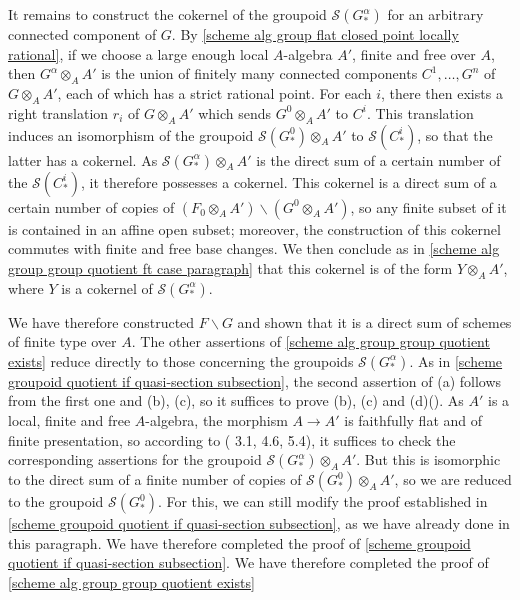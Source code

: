 It remains to construct the cokernel of the groupoid $\mathcal{S}(G_*^\alpha)$ for an arbitrary connected component of $G$. By \cref{scheme alg group flat closed point locally rational}, if we choose a large enough local $A$-algebra $A'$, finite and free over $A$, then $G^\alpha\otimes_AA'$ is the union of finitely many connected components $C^1,\dots,G^n$ of $G\otimes_AA'$, each of which has a strict rational point. For each $i$, there then exists a right translation $r_i$ of $G\otimes_AA'$ which sends $G^0\otimes_AA'$ to $C^i$. This translation induces an isomorphism of the groupoid $\mathcal{S}(G^0_*)\otimes_AA'$ to $\mathcal{S}(C^i_*)$, so that the latter has a cokernel. As $\mathcal{S}(G^\alpha_*)\otimes_AA'$ is the direct sum of a certain number of the $\mathcal{S}(C^i_*)$, it therefore possesses a cokernel. This cokernel is a direct sum of a certain number of copies of $(F_0\otimes_AA')\backslash(G^0\otimes_AA')$, so any finite subset of it is contained in an affine open subset; moreover, the construction of this cokernel commutes with finite and free base changes. We then conclude as in \ref{scheme alg group group quotient ft case paragraph} that this cokernel is of the form $Y\otimes_AA'$, where $Y$ is a cokernel of $\mathcal{S}(G^\alpha_*)$.\par
We have therefore constructed $F\backslash G$ and shown that it is a direct sum of schemes of finite type over $A$. The other assertions of \cref{scheme alg group group quotient exists} reduce directly to those concerning the groupoids $\mathcal{S}(G^\alpha_*)$. As in \autoref{scheme groupoid quotient if quasi-section subsection}, the second assertion of (a) follows from the first one and (b), (c), so it suffices to prove (b), (c) and (d)(). As $A'$ is a local, finite and free $A$-algebra, the morphism $A\to A'$ is faithfully flat and of finite presentation, so according to (\cite{SGA1}  3.1, 4.6, 5.4), it suffices to check the corresponding assertions for the groupoid $\mathcal{S}(G^\alpha_*)\otimes_AA'$. But this is isomorphic to the direct sum of a finite number of copies of $\mathcal{S}(G_*^0)\otimes_AA'$, so we are reduced to the groupoid $\mathcal{S}(G^0_*)$. For this, we can still modify the proof established in \autoref{scheme groupoid quotient if quasi-section subsection}, as we have already done in this paragraph. We have therefore completed the proof of \autoref{scheme groupoid quotient if quasi-section subsection}. We have therefore completed the proof of \cref{scheme alg group group quotient exists}\par

